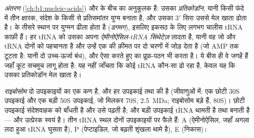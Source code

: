 \begin{definition}\label{def:b1:gene-expression:trna}
\emph{अंतरण } (\cref{ch:b1:nucleic-acids})  और  के
बीच का अनुकूलक है: उसका \emph{प्रतिकोडॉन}, यानी किसी फंदे में तीन
क्षारक, संदेश के किसी  से प्रतिसमांतर युग्म बनाता है, और उसका $3'$
सिरा उससे मेल खाता  ढोता है।  के तीसरे स्थान पर युग्मन
ढीला होता है (\emph{डगमग}), इसलिए इकसठ  के लिए लगभग चालीस tRNA
काफ़ी हैं। हर tRNA को उसका अपना
\emph{ऐमीनोऐसिल-tRNA सिंथेटेज़} लादता है, यानी वह  जो 
और tRNA दोनों को पहचानता है और उन्हें एक  की क़ीमत पर दो चरणों में
जोड़ देता है (जो AMP तक टूटता है: यानी दो उच्च-ऊर्जा बंध), और ऐसा करते
हुए  का प्रूफ़-पठन भी करता है। ये बीस  ही वे जगहें हैं
जहाँ कूट सचमुच लागू होता है:  यह नहीं जाँचता कि कोई tRNA कौन-सा
 ढो रहा है, केवल यह कि उसका प्रतिकोडॉन मेल खाता है।
\end{definition}

\begin{definition}[राइबोसोम]\label{def:b1:gene-expression:ribosome}
\emph{राइबोसोम} दो उपइकाइयों का एक कण है, और हर उपइकाई  तथा  की है (जीवाणुओं में: एक छोटी 30S उपइकाई और एक बड़ी 50S
उपइकाई, जो मिलकर 70S, \qty{2.5}{MDa};  राइबोसोम
बड़े हैं, 80S)। छोटी उपइकाई संदेशवाहक को बाँधती है और उसे पढ़ती है;
और बड़ी उपइकाई tRNA थामती है तथा  बनाती है --- और
उत्प्रेरक स्वयं  है। तीन tRNA स्थल दोनों उपइकाइयों पर
फैले हैं: A (ऐमीनोऐसिल, जहाँ अगला लदा हुआ tRNA घुसता है), P
(पेप्टाइडिल, जो बढ़ती शृंखला थामे है), E (निकास)।
\end{definition}

